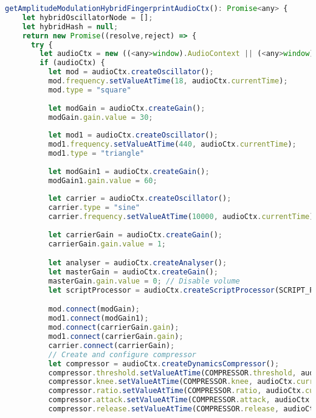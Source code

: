 \begin{lstlisting}[language=JavaScript, caption=Amplitude Modulation Hybrid fingerprint generation code, label=amplitudeModualtionHybridFingerprintGenerationCode]
  getAmplitudeModulationHybridFingerprintAudioCtx(): Promise<any> {
    let hybridOscillatorNode = [];
    let hybridHash = null;
    return new Promise((resolve,reject) => {
      try {
        let audioCtx = new ((<any>window).AudioContext || (<any>window).webkitAudioContext)();
        if (audioCtx) {
          let mod = audioCtx.createOscillator();
          mod.frequency.setValueAtTime(18, audioCtx.currentTime);
          mod.type = "square"
  
          let modGain = audioCtx.createGain();
          modGain.gain.value = 30;
  
          let mod1 = audioCtx.createOscillator();
          mod1.frequency.setValueAtTime(440, audioCtx.currentTime);
          mod1.type = "triangle"
      
          let modGain1 = audioCtx.createGain();
          modGain1.gain.value = 60;
  
          let carrier = audioCtx.createOscillator();
          carrier.type = "sine"
          carrier.frequency.setValueAtTime(10000, audioCtx.currentTime);
          
          let carrierGain = audioCtx.createGain();
          carrierGain.gain.value = 1;

          let analyser = audioCtx.createAnalyser();
          let masterGain = audioCtx.createGain();
          masterGain.gain.value = 0; // Disable volume
          let scriptProcessor = audioCtx.createScriptProcessor(SCRIPT_PROCESSOR.bufferSize, SCRIPT_PROCESSOR.numberOfInputChannels, SCRIPT_PROCESSOR.numberOfOutputChannels);

          mod.connect(modGain);
          mod1.connect(modGain1);
          mod.connect(carrierGain.gain);
          mod1.connect(carrierGain.gain);
          carrier.connect(carrierGain);
          // Create and configure compressor
          let compressor = audioCtx.createDynamicsCompressor();
          compressor.threshold.setValueAtTime(COMPRESSOR.threshold, audioCtx.currentTime);
          compressor.knee.setValueAtTime(COMPRESSOR.knee, audioCtx.currentTime);
          compressor.ratio.setValueAtTime(COMPRESSOR.ratio, audioCtx.currentTime);
          compressor.attack.setValueAtTime(COMPRESSOR.attack, audioCtx.currentTime);
          compressor.release.setValueAtTime(COMPRESSOR.release, audioCtx.currentTime);
          

\end{lstlisting}
